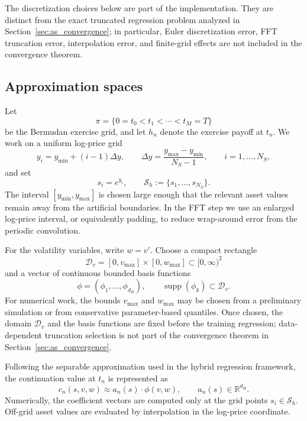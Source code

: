 \documentclass[pdflatex,sn-mathphys-num]{sn-jnl}
\theoremstyle{thmstyleone}%
\theoremstyle{thmstylethree}%
\theoremstyle{thmstyletwo}%
\newcommand{\R}{\mathbb R}
\providecommand{\supp}{\operatorname{supp}}
\begin{document}
The discretization choices below are part of the implementation. They are
distinct from the exact truncated regression problem analyzed in
Section~\ref{sec:as_convergence}; in particular, Euler discretization error, FFT
truncation error, interpolation error, and finite-grid effects are not included
in the convergence theorem.

\subsection{Approximation spaces}
Let
\[
    \pi=\{0=t_0<t_1<\cdots<t_M=T\}
\]
be the Bermudan exercise grid, and let $h_n$ denote the exercise payoff at
$t_n$. We work on a uniform log-price grid
\[
    y_i=y_{\min}+(i-1)\Delta y,
    \qquad
    \Delta y=\frac{y_{\max}-y_{\min}}{N_S-1},
    \qquad
    i=1,\ldots,N_S,
\]
and set
\[
    s_i=e^{y_i},
    \qquad
    \mathcal S_h:=\{s_1,\ldots,s_{N_S}\}.
\]
The interval $[y_{\min},y_{\max}]$ is chosen large enough that the relevant
asset values remain away from the artificial boundaries. In the FFT step we use
an enlarged log-price interval, or equivalently padding, to reduce wrap-around
error from the periodic convolution.

For the volatility variables, write $w=v'$. Choose a compact rectangle
\[
    \mathcal D_v=[0,v_{\max}]\times[0,w_{\max}]\subset[0,\infty)^2
\]
and a vector of continuous bounded basis functions
\[
    \phi=(\phi_1,\ldots,\phi_{d_B}),
    \qquad
    \supp(\phi_k)\subset \mathcal D_v.
\]
For numerical work, the bounds $v_{\max}$ and $w_{\max}$ may be chosen from a
preliminary simulation or from conservative parameter-based quantiles. Once chosen, the domain
$\mathcal D_v$ and the basis functions are fixed before the training regression;
data-dependent truncation selection is not part of the convergence theorem in
Section~\ref{sec:as_convergence}.

Following the separable approximation used in the hybrid regression framework,
the continuation value at $t_n$ is represented as
\[
    c_n(s,v,w)\approx a_n(s)\cdot\phi(v,w),
    \qquad
    a_n(s)\in\R^{d_B}.
\]
Numerically, the coefficient vectors are computed only at the grid points
$s_i\in\mathcal S_h$. Off-grid asset values are evaluated by interpolation in the
log-price coordinate.
\end{document}
